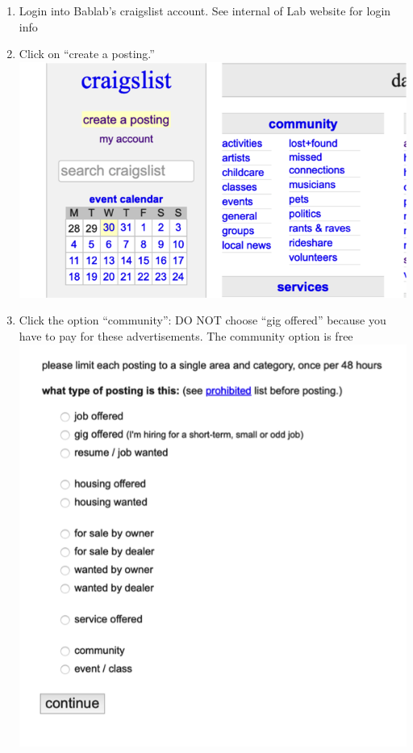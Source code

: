 \documentclass[]{book}
\begin{document}
\begin{enumerate}
\def\labelenumi{\arabic{enumi}.}
\item
  Login into Bablab's craigslist account. See internal of Lab website for login info
\item
  Click on ``create a posting.''
  \includegraphics{images/lab_protocols/craigslist/1.png}
\item
  Click the option ``community'': DO NOT choose ``gig offered'' because you have to pay for these advertisements. The community option is free
  \includegraphics{images/lab_protocols/craigslist/2.png}

\end{enumerate}
\end{document}
